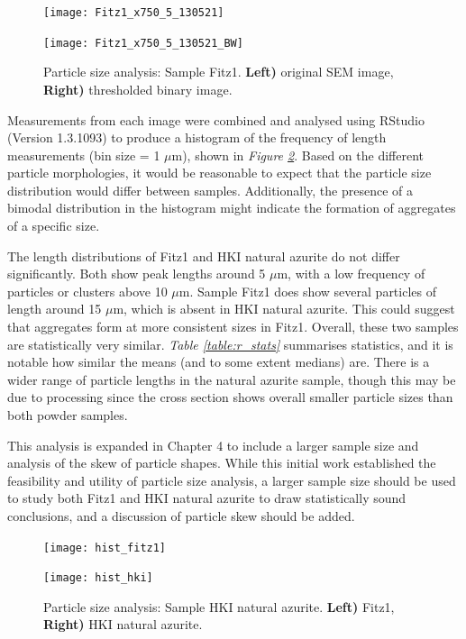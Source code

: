 \begin{figure}[H]
\centering
\begin{minipage}{.45\textwidth}
  \centering
  \texttt{[image: Fitz1\_x750\_5\_130521]}
\end{minipage}
\begin{minipage}{.45\textwidth}
  \centering
  \texttt{[image: Fitz1\_x750\_5\_130521\_BW]}
\end{minipage}
\caption[Particle size analysis: Sample Fitz1]{Particle size analysis: Sample Fitz1. \textbf{Left)} original SEM image, \textbf{Right)} thresholded binary image.}
\label{fig:imageJ_fitz1}
\end{figure}

Measurements from each image were combined and analysed using RStudio (Version 1.3.1093) to produce a histogram of the frequency of length measurements (bin size = 1 $\mu$m), shown in \textit{Figure \ref{fig:histogram_length}}. Based on the different particle morphologies, it would be reasonable to expect that the particle size distribution would differ between samples. Additionally, the presence of a bimodal distribution in the histogram might indicate the formation of aggregates of a specific size. 

The length distributions of Fitz1 and HKI natural azurite do not differ significantly. Both show peak lengths around 5 $\mu$m, with a low frequency of particles or clusters above 10 $\mu$m. Sample Fitz1 does show several particles of length around 15 $\mu$m, which is absent in HKI natural azurite. This could suggest that aggregates form at more consistent sizes in Fitz1. Overall, these two samples are statistically very similar. \textit{Table \ref{table:r_stats}} summarises statistics, and it is notable how similar the means (and to some extent medians) are. There is a wider range of particle lengths in the natural azurite sample, though this may be due to processing since the cross section shows overall smaller particle sizes than both powder samples. 

This analysis is expanded in Chapter 4 to include a larger sample size and analysis of the skew of particle shapes. While this initial work established the feasibility and utility of particle size analysis, a larger sample size should be used to study both Fitz1 and HKI natural azurite to draw statistically sound conclusions, and a discussion of particle skew should be added.

\begin{figure}[H]
\centering
\begin{minipage}{.45\textwidth}
  \centering
  \texttt{[image: hist\_fitz1]}
\end{minipage}
\begin{minipage}{.45\textwidth}
  \centering
  \texttt{[image: hist\_hki]}
\end{minipage}
\caption[Particle size analysis: HKI natural azurite, Fitz1]{Particle size analysis: Sample HKI natural azurite. \textbf{Left)} Fitz1, \textbf{Right)} HKI natural azurite.}
\label{fig:histogram_length}
\end{figure}

